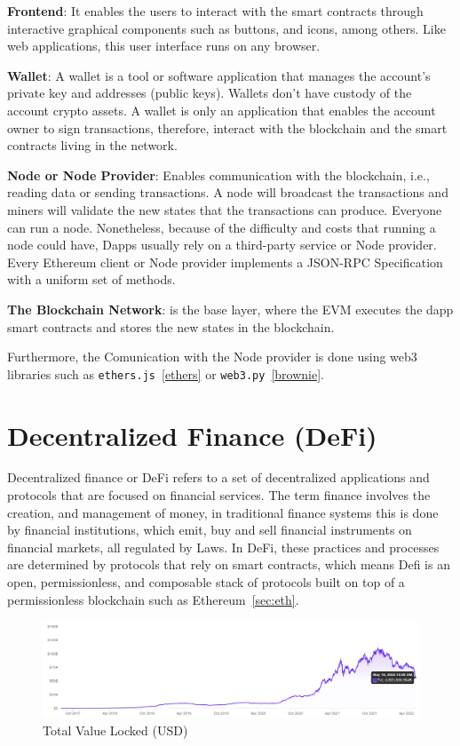 \documentclass[11pt,a4paper]{report}
\begin{document}
\begin{description}		
	\item \textbf{Frontend}: It enables the users to interact with the smart contracts through interactive graphical components such as buttons, and icons, among others. Like web applications, this user interface runs on any browser.
	\item \textbf{Wallet}: A wallet is a tool or software application that manages the account's private key and addresses (public keys). Wallets don't have custody of the account crypto assets. A wallet is only an application that enables the account owner to sign transactions, therefore, interact with the blockchain and the smart contracts living in the network.
	\item \textbf{Node or Node Provider}: Enables communication with the blockchain, i.e., reading data or sending transactions. A node will broadcast the transactions and miners will validate the new states that the transactions can produce. Everyone can run a node. Nonetheless, because of the difficulty and costs that running a node could have, Dapps usually rely on a third-party service or Node provider. Every Ethereum client or Node provider implements a JSON-RPC\cite{json_rpc} Specification with a uniform set of methods.
	\item \textbf{The Blockchain Network}: is the base layer, where the EVM executes the dapp smart contracts and stores the new states in the blockchain.
\end{description}
Furthermore, the Comunication with the Node provider is done using web3 libraries such as \verb|ethers.js|~\ref{ethers} or \verb|web3.py|~\ref{brownie}.
\chapter{Decentralized Finance (DeFi)} \label{ch:defi}
Decentralized finance or DeFi\cite{article:cefidefi}\cite{article:defi} refers to a set of decentralized applications and protocols that are focused on financial services. The term finance\cite{wiki:Finance} involves the creation, and management of money, in traditional finance systems this is done by financial institutions\cite{wiki:Financial_institution}, which emit, buy and sell financial instruments\cite{wiki:Financial_instrument} on financial markets\cite{wiki:Financial_market}, all regulated by Laws. In DeFi,  these practices and processes are determined by protocols that rely on smart contracts, which means Defi is an open, permissionless, and composable stack of protocols built on top of a permissionless blockchain such as Ethereum~\ref{sec:eth}. 
\begin{figure}[htp]
	\centering
	\includegraphics[width=1\textwidth]{./images/tvl}
	\caption{Total Value Locked (USD)\cite{defipulse}}
	\label{fig:tvl}
\end{figure}
\end{document}
